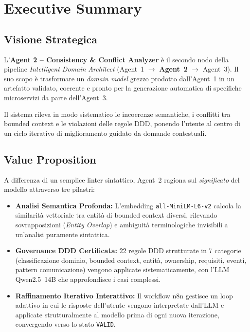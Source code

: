 \documentclass[12pt,a4paper]{report}
\begin{document}
\tableofcontents
\clearpage

\listoffigures
\clearpage

\listoftables
\clearpage

\chapter{Executive Summary}

\section{Visione Strategica}

L'\textbf{Agent 2 -- Consistency \& Conflict Analyzer} è il secondo nodo della pipeline
\textit{Intelligent Domain Architect} (Agent~1 $\rightarrow$ \textbf{Agent~2} $\rightarrow$ Agent~3).
Il suo scopo è trasformare un \textit{domain model} grezzo prodotto dall'Agent~1
in un artefatto validato, coerente e pronto per la generazione automatica di specifiche
microservizi da parte dell'Agent~3.

Il sistema rileva in modo sistematico le incoerenze semantiche, i conflitti tra bounded
context e le violazioni delle regole DDD, ponendo l'utente al centro di un ciclo
iterativo di miglioramento guidato da domande contestuali.

\section{Value Proposition}

A differenza di un semplice linter sintattico, Agent~2 ragiona sul \textit{significato} del modello
attraverso tre pilastri:

\begin{itemize}
  \item \textbf{Analisi Semantica Profonda:} L'embedding \texttt{all-MiniLM-L6-v2}
        calcola la similarità vettoriale tra entità di bounded context diversi,
        rilevando sovrapposizioni (\textit{Entity Overlap}) e ambiguità terminologiche
        invisibili a un'analisi puramente sintattica.

  \item \textbf{Governance DDD Certificata:} 22 regole DDD strutturate in 7 categorie
        (classificazione dominio, bounded context, entità, ownership, requisiti, eventi,
        pattern comunicazione) vengono applicate sistematicamente, con l'LLM Qwen2.5~14B
        che approfondisce i casi complessi.

  \item \textbf{Raffinamento Iterativo Interattivo:} Il workflow n8n gestisce un loop
        adattivo in cui le risposte dell'utente vengono interpretate dall'LLM e
        applicate strutturalmente al modello prima di ogni nuova iterazione,
        convergendo verso lo stato \texttt{VALID}.
\end{itemize}
\end{document}

